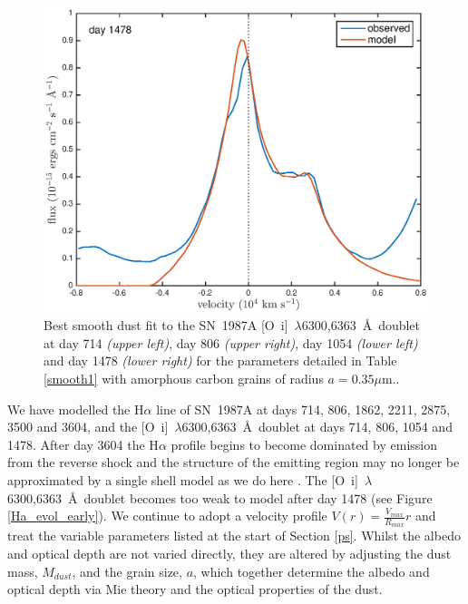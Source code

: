 \documentclass[useAMS,usenatbib,usegraphicx]{mnras}
\begin{document}
\begin{figure}
\begin{center}
\includegraphics[trim =33 10 45 15,clip=true,scale=0.47]{smooth/best_fit/d1478OI}
\caption{Best smooth dust fit to the SN~1987A [O~{\sc i}]~$\lambda$6300,6363~\AA\ doublet at day 714 \textit{(upper left)}, day 806 \textit{(upper right)}, day 1054 \textit{(lower left)} and day 1478 \textit{(lower right)} for the parameters detailed in Table \ref{smooth1} with amorphous carbon grains of radius $a=0.35 \mu$m..}
\label{OI_smooth}
\end{center}
\end{figure}


We have  modelled the H$\alpha$ line of SN~1987A at days 714, 806, 1862, 2211, 2875, 3500 and 3604, and the 
[O~{\sc i}]~$\lambda$6300,6363~\AA\ doublet at days 714, 806, 1054 and 1478.  After day 3604 the H$\alpha$ profile begins to become dominated by emission from the reverse shock 
and the structure of the emitting region may no longer be approximated by 
a single shell model as we do here \citep{Fransson2013}.  The [O~{\sc i}]~$\lambda$6300,6363~\AA\ doublet becomes too weak to model after day 1478  (see Figure \ref{Ha_evol_early}).  We continue to adopt a velocity profile $V(r) = 
\frac{V_{max}}{R_{max}}r$ and treat the variable parameters listed at the start of 
Section \ref{ps}.  Whilst the albedo and optical depth are not varied 
directly, they are altered by adjusting the dust mass, $M_{dust}$, and the 
grain size, $a$, which together determine the albedo and optical 
depth via  Mie theory and the optical properties of the 
dust.
\end{document}
